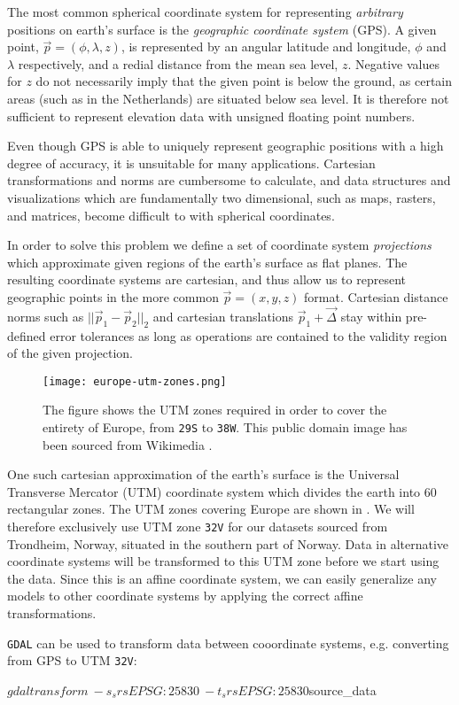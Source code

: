 The most common spherical coordinate system for representing \textit{arbitrary} positions on earth's surface is the \textit{geographic coordinate system} (GPS).
A given point, $\vec{p} = (\phi, \lambda, z)$, is represented by an angular latitude and longitude, $\phi$ and $\lambda$ respectively, and a redial distance from the mean sea level, $z$.
Negative values for $z$ do not necessarily imply that the given point is below the ground, as certain areas (such as in the Netherlands) are situated below sea level.
It is therefore not sufficient to represent elevation data with unsigned floating point numbers.

Even though GPS is able to uniquely represent geographic positions with a high degree of accuracy, it is unsuitable for many applications.
Cartesian transformations and norms are cumbersome to calculate, and data structures and visualizations which are fundamentally two dimensional, such as maps, rasters, and matrices, become difficult to with spherical coordinates.

In order to solve this problem we define a set of coordinate system \textit{projections} which approximate given regions of the earth's surface as flat planes.
The resulting coordinate systems are cartesian, and thus allow us to represent geographic points in the more common $\vec{p} = (x, y, z)$ format.
Cartesian distance norms such as $||\vec{p}_1 - \vec{p}_2||_2$ and cartesian translations $\vec{p}_1 + \vec{\Delta}$ stay within pre-defined error tolerances as long as operations are contained to the validity region of the given projection.

\begin{wrapfigure}[15]{r}{0.38\linewidth}
  \vspace{-1em}
  \centering
  \texttt{[image: europe-utm-zones.png]}
  \caption{
    The figure shows the UTM zones required in order to cover the entirety of Europe, from \texttt{29S} to \texttt{38W}.
    This public domain image has been sourced from Wikimedia \cite{wiki:europe_utm_zones}.
  }
  \label{fig:europe-utm-zones}
\end{wrapfigure}

One such cartesian approximation of the earth's surface is the Universal Transverse Mercator (UTM) coordinate system which divides the earth into 60 rectangular zones. The UTM zones covering Europe are shown in .
We will therefore exclusively use UTM zone \texttt{32V} for our datasets sourced from Trondheim, Norway, situated in the southern part of Norway.
Data in alternative coordinate systems will be transformed to this UTM zone before we start using the data.
Since this is an affine coordinate system, we can easily generalize any models to other coordinate systems by applying the correct affine transformations.

\texttt{GDAL} can be used to transform data between cooordinate systems, e.g. converting from GPS to UTM \texttt{32V}:
\begin{shellcode}
$ gdaltransform \
    -s_srs EPSG:25830 \
    -t_srs EPSG:25830 ${source_data}
\end{shellcode}
